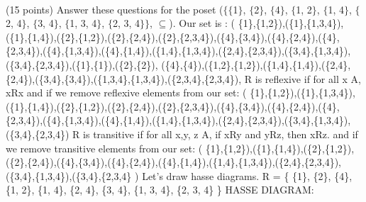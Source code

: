 \documentclass[a4 paper]{article}
\numberwithin{equation}{section}
\newcommand{\problem}[2]{~\\\fbox{\textbf{Problem #1}}\hfill (#2 points)\newline\newline}
\newcommand{\0}{\mathbf{0}}
\begin{document}
\newpage
\problem{2: Relations}{15}
Answer these questions for the poset ($\{\{$1$\}$, $\{$2$\}$, $\{$4$\}$, $\{$1, 2$\}$, $\{$1, 4$\}$, $\{$2, 4$\}$, $\{$3, 4$\}$, $\{$1, 3, 4$\}$, $\{$2, 3, 4$\}\}$, $\subseteq$).
\newline
\newline
Our set is :
\newline
(  \{1\},\{1,2\}),(\{1\},\{1,3,4\}),(\{1\},\{1,4\}),(\{2\},\{1,2\}),(\{2\},\{2,4\}),(\{2\},\{2,3,4\}),(\{4\},\{3,4\}),(\{4\},\{2,4\}),(\{4\},\{2,3,4\}),(\{4\},\{1,3,4\})\newline,(\{4\},\{1,4\}),(\{1,4\},\{1,3,4\}),(\{2,4\},\{2,3,4\}),(\{3,4\},\{1,3,4\}),(\{3,4\},\{2,3,4\}),(\{1\},\{1\}),(\{2\},\{2\}),
(\{4\},\{4\}),(\{1,2\},\{1,2\}),\newline(\{1,4\},\{1,4\}),(\{2,4\},\{2,4\}),(\{3,4\},\{3,4\}),(\{1,3,4\},\{1,3,4\}),(\{2,3,4\},\{2,3,4\}),
\newline
\newline
R is reflexive if for all x  A, xRx
and if we remove reflexive elements from our set:
\newline
\newline
(  \{1\},\{1,2\}),(\{1\},\{1,3,4\}),(\{1\},\{1,4\}),(\{2\},\{1,2\}),(\{2\},\{2,4\}),(\{2\},\{2,3,4\}),(\{4\},\{3,4\}),(\{4\},\{2,4\}),(\{4\},\{2,3,4\}),(\{4\},\{1,3,4\})\newline,(\{4\},\{1,4\}),(\{1,4\},\{1,3,4\}),(\{2,4\},\{2,3,4\}),(\{3,4\},\{1,3,4\}),(\{3,4\},\{2,3,4\})
\newline
\newline
R is transitive if for all x,y, z  A, if xRy and yRz, then xRz.
\newline
and if we remove transitive elements from our set:
\newline
\newline
(  \{1\},\{1,2\}),(\{1\},\{1,4\}),(\{2\},\{1,2\}),(\{2\},\{2,4\}),(\{4\},\{3,4\}),(\{4\},\{2,4\})\newline,(\{4\},\{1,4\}),(\{1,4\},\{1,3,4\}),(\{2,4\},\{2,3,4\}),(\{3,4\},\{1,3,4\}),(\{3,4\},\{2,3,4\}  )
\newline
\newline
Let's draw hasse diagrams.
\newpage
R = \{ \{1\}, \{2\}, \{4\}, \{1, 2\}, \{1, 4\}, \{2, 4\}, \{3, 4\}, \{1, 3, 4\}, \{2, 3, 4\} \}
\newline
HASSE DIAGRAM:
\newline
\end{document}

